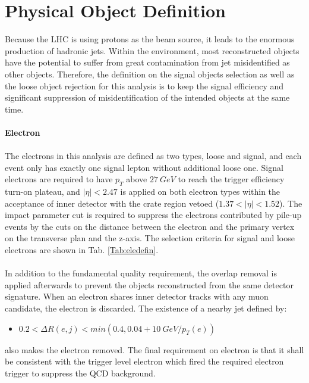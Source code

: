 \section{Physical Object Definition}
\label{sec:obj_def}
Because the LHC is using protons as the beam source, it leads to the enormous production of hadronic jets. Within the environment, most reconstructed objects have the potential to suffer from great contamination from jet misidentified as other objects. Therefore, the definition on the signal objects selection as well as the loose object rejection for this analysis is to keep the signal efficiency and significant suppression of misidentification of the intended objects at the same time. 
\\
\\{\bf Electron}
\\
\\The electrons in this analysis are defined as two types, loose and signal, and each event only has exactly one signal lepton without additional loose one. Signal electrons are required to have $p_{T}$ above $27~GeV$ to reach the trigger efficiency turn-on plateau, and $|\eta|<2.47$ is applied on both electron types within the acceptance of inner detector with the crate region vetoed ($1.37<|\eta|<1.52$). The impact parameter cut is required to suppress the electrons contributed by pile-up events by the cuts on the distance between the electron and the primary vertex on the transverse plan and the z-axis. The selection criteria for signal and loose electrons are shown in Tab. \ref{Tab:eledefin}. 
\\
\\In addition to the fundamental quality requirement, the overlap removal is applied afterwards to prevent the objects reconstructed from the same detector signature. When an electron shares inner detector tracks with any muon candidate, the electron is discarded. The existence of a nearby jet defined by:
\begin{itemize}
	\item $0.2<\Delta R(e,j)<min(0.4,0.04+10~GeV/p_{T}(e))$
\end{itemize}
also makes the electron removed. The final requirement on electron is that it shall be consistent with the trigger level electron which fired the required electron trigger to suppress the QCD background. 
